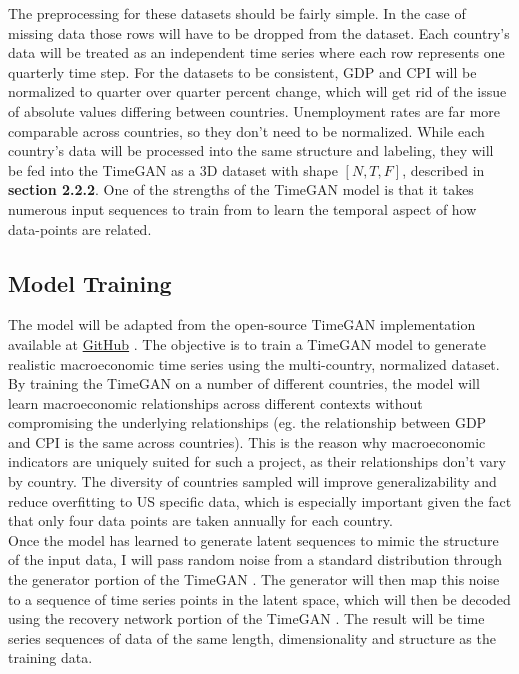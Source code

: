 \documentclass[10pt,twocolumn]{article}
\begin{document}
\indent{}The preprocessing for these datasets should be fairly simple. In the case of missing data those rows will have to be dropped from the dataset. Each country's data will be treated as an independent time series where each row represents one quarterly time step. For the datasets to be consistent, GDP and CPI will be normalized to quarter over quarter percent change, which will get rid of the issue of absolute values differing between countries. Unemployment rates are far more comparable across countries, so they don’t need to be normalized. While each country’s data will be processed into the same structure and labeling, they will be fed into the TimeGAN as a 3D dataset with shape $[N, T, F]$, described in \textbf{section 2.2.2}. One of the strengths of the TimeGAN model is that it takes numerous input sequences to train from to learn the temporal aspect of how data-points are related. 


\subsection{Model Training}
The model will be adapted from the open-source TimeGAN implementation available at \href{https://github.com/jsyoon0823/TimeGAN/tree/master/}{GitHub} \cite{yoon2019timeseriesgenerative}. The objective is to train a TimeGAN model to generate realistic macroeconomic time series using the multi-country, normalized dataset. By training the TimeGAN on a number of different countries, the model will learn macroeconomic relationships across different contexts without compromising the underlying relationships (eg. the relationship between GDP and CPI is the same across countries). This is the reason why macroeconomic indicators are uniquely suited for such a project, as their relationships don’t vary by country. The diversity of countries sampled will improve generalizability and reduce overfitting to US specific data, which is especially important given the fact that only four data points are taken annually for each country.\\
\indent{}Once the model has learned to generate latent sequences to mimic the structure of the input data, I will pass random noise from a standard distribution through the generator portion of the TimeGAN \cite{yoon2019timeseriesgenerative}. The generator will then map this noise to a sequence of time series points in the latent space, which will then be decoded using the recovery network portion of the TimeGAN \cite{yoon2019timeseriesgenerative}. The result will be time series sequences of data of the same length, dimensionality and structure as the training data.
\end{document}
